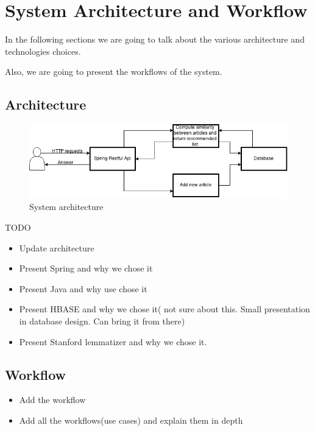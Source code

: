 \chapter{System Architecture and Workflow}
\label{chapter:system-architecture}

In the following sections we are going to talk about the various architecture and technologies choices.

Also, we are going to present the workflows of the system.

\section{Architecture} 
\label{sec:architecture}

\begin{figure}[h]
\caption{System architecture}
\includegraphics[width=1.0\textwidth]{src/img/architecture.png}
\end{figure}


TODO
\begin{itemize}
	\item Update architecture
	\item Present Spring and why we chose it	
	\item Present Java and why use chose it
	\item Present HBASE and why we chose it( not sure about this. Small presentation in database design. Can bring it from there)
	\item Present Stanford lemmatizer and why we chose it.	
\end{itemize}


\section{Workflow} 
\label{sec:workflow}

\begin{itemize}
	\item Add the workflow
	\item Add all the workflows(use cases) and explain them in depth
\end{itemize}